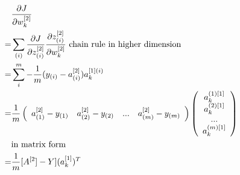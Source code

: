 \documentclass[a4paper]{article}
\begin{document}
\begin{align*}
	 & \frac{\partial J}{\partial w_k^{[2]}}\\
	= & \sum_{(i)} \frac{\partial J}{\partial z_{(i)}^{[2]}} \frac{\partial  z_{(i)}^{[2]}}{\partial  w_k^{[2]}} \textmd { chain rule in higher dimension}\\
	= &\sum_{i}^{m} -\frac{1}{m} (y_{(i)} - a_{(i)}^{[2]}) a_k^{[1](i)}\\
	= &\frac{1}{m} \left( \begin{array} {c c c c}
	 a_{(1)}^{[2]} - y_{(1)} & a_{(2)}^{[2]} - y_{(2)} & ... & a_{(m)}^{[2]} - y_{(m)}  \\
	\end{array} \right)
	\left( \begin{array} {c }
	 a_k^{(1)[1]}  \\
	 a_k^{(2)[1]}  \\
		... \\
	 a_k^{(m)[1]}  \\
	\end{array} \right)\\
	&\textrm {in matrix form}\\
	= &\frac{1}{m} [A^{[2}] - Y] (a_k^{[1]})^T	
\end{align*}
\end{document}
